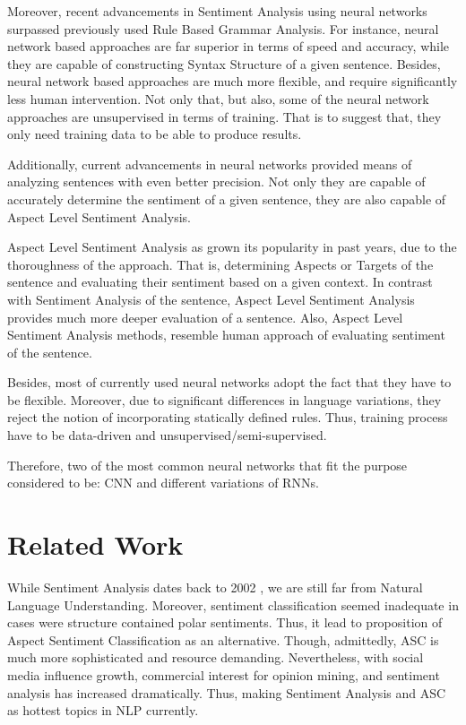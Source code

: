 \documentclass[conference]{IEEEtran}
\begin{document}
Moreover, recent advancements in Sentiment Analysis using neural networks surpassed previously used Rule Based Grammar Analysis. For instance, neural network based approaches are far superior in terms of speed and accuracy, while they are capable of constructing Syntax Structure of a given sentence. Besides, neural network based approaches are much more flexible, and require significantly less human intervention. Not only that, but also, some of the neural network approaches are unsupervised in terms of training. That is to suggest that, they only need training data to be able to produce results.

Additionally, current advancements in neural networks provided means of analyzing sentences with even better precision. Not only they are capable of accurately determine the sentiment of a given sentence, they are also capable of Aspect Level Sentiment Analysis. 

Aspect Level Sentiment Analysis as grown its popularity in past years, due to the thoroughness of the approach. That is, determining Aspects or Targets of the sentence and evaluating their sentiment based on a given context. In contrast with Sentiment Analysis of the sentence, Aspect Level Sentiment Analysis provides much more deeper evaluation of a sentence. Also, Aspect Level Sentiment Analysis methods, resemble human approach of evaluating sentiment of the sentence.

Besides, most of currently used neural networks adopt the fact that they have to be flexible. Moreover, due to significant differences in language variations, they reject the notion of incorporating statically defined rules. Thus, training process have to be data-driven and unsupervised/semi-supervised.

Therefore, two of the most common neural networks that fit the purpose considered to be: CNN and different variations of RNNs.

\section{Related Work}
While Sentiment Analysis dates back to 2002 \cite{pang-etal-2002-thumbs}, we are still far from Natural Language Understanding.
Moreover, sentiment classification seemed inadequate in cases were structure contained polar sentiments. Thus, it lead to proposition of Aspect Sentiment Classification \cite{Sentiment:Aspect:Hu:2004} as an alternative. Though, admittedly, ASC is much more sophisticated and resource demanding. Nevertheless, with social media influence growth, commercial interest for opinion mining, and sentiment analysis has increased dramatically. Thus, making Sentiment Analysis and ASC as hottest topics in NLP currently.
\end{document}
